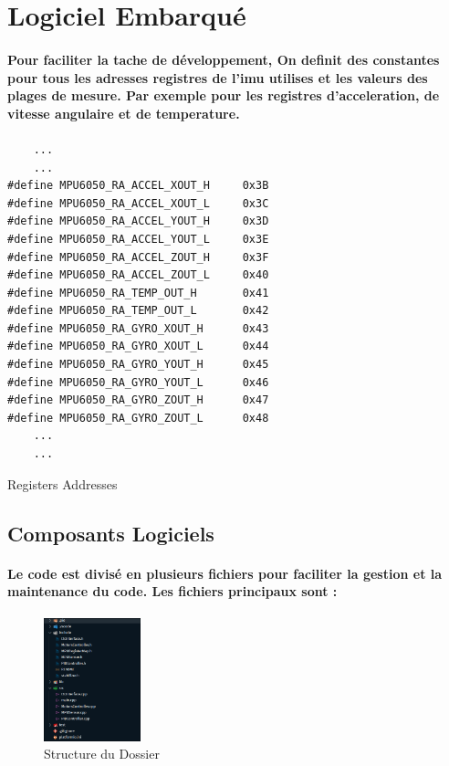 \section{Logiciel Embarqué}

\paragraph{
	Pour faciliter la tache de développement, On definit des constantes pour tous les adresses registres de l'\gls{imu} utilises et les valeurs des plages de mesure. Par exemple pour les registres d'acceleration, de vitesse angulaire et de temperature.
}
\paragraph*{}
\begin{listing}[!htpb]
	\begin{verbatim}
	...
	...
#define MPU6050_RA_ACCEL_XOUT_H     0x3B
#define MPU6050_RA_ACCEL_XOUT_L     0x3C
#define MPU6050_RA_ACCEL_YOUT_H     0x3D
#define MPU6050_RA_ACCEL_YOUT_L     0x3E
#define MPU6050_RA_ACCEL_ZOUT_H     0x3F
#define MPU6050_RA_ACCEL_ZOUT_L     0x40
#define MPU6050_RA_TEMP_OUT_H       0x41
#define MPU6050_RA_TEMP_OUT_L       0x42
#define MPU6050_RA_GYRO_XOUT_H      0x43
#define MPU6050_RA_GYRO_XOUT_L      0x44
#define MPU6050_RA_GYRO_YOUT_H      0x45
#define MPU6050_RA_GYRO_YOUT_L      0x46
#define MPU6050_RA_GYRO_ZOUT_H      0x47
#define MPU6050_RA_GYRO_ZOUT_L      0x48
	...
	...
	\end{verbatim}
	\caption{Registers Addresses}
	\label{listing:registers-addresses}
\end{listing}


\subsection{Composants Logiciels}

\paragraph{Le code est divisé en plusieurs fichiers pour faciliter la gestion et la maintenance du code. Les fichiers principaux sont :}
\paragraph*{}
\begin{figure}[!htpb]
	\centering
	\includegraphics[width=0.25\textwidth]{Figures/folder-structure.png}
	\caption{Structure du Dossier}
	\label{fig:folder-structure}
\end{figure}

